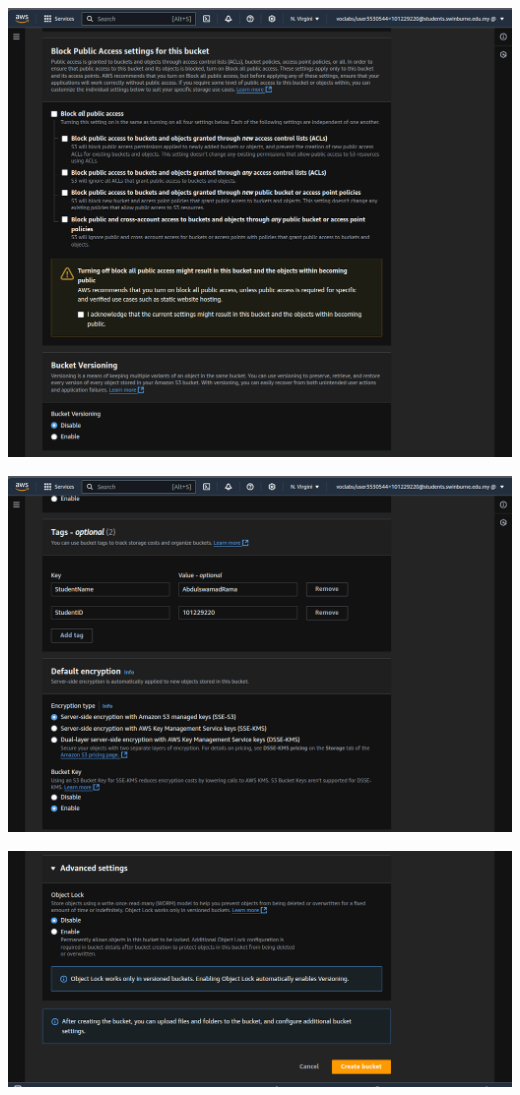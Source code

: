 \documentclass[11pt]{article}
\begin{document}
\begin{enumerate}[resume]
    {\centering
    \includegraphics[width=5.8in]{pics/33b.png}
    }

    {\centering
    \includegraphics[width=5.8in]{pics/33c.png}
    }


    {\centering
    \includegraphics[width=5.8in]{pics/33d.png}
    }





\end{enumerate}
\end{document}

